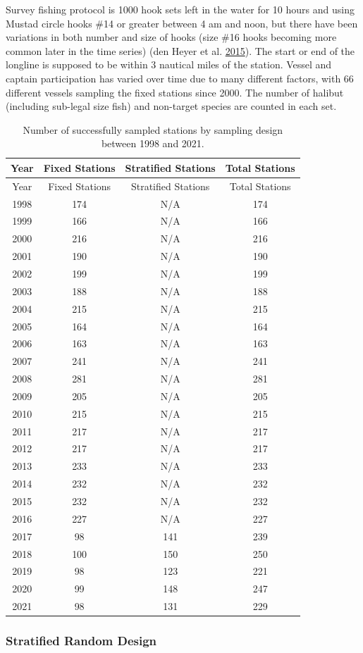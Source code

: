 \documentclass[12pt]{article}\usepackage[]{graphicx}\usepackage[]{color}
\begin{document}
Survey fishing protocol is 1000 hook sets left in the water for 10 hours and using Mustad circle hooks \#14 or greater between 4 am and noon, but there have been variations in both number and size of hooks (size \#16 hooks becoming more common later in the time series) (den Heyer et al. \protect\hyperlink{ref-DenHeyer2015}{2015}). The start or end of the longline is supposed to be within 3 nautical miles of the station. Vessel and captain participation has varied over time due to many different factors, with 66 different vessels sampling the fixed stations since 2000. The number of halibut (including sub-legal size fish) and non-target species are counted in each set.
\begin{longtable}[]{@{}cccc@{}}
\caption{\label{tab:stat-samp}Number of successfully sampled stations by sampling design between 1998 and 2021.}\tabularnewline
\toprule
Year & Fixed Stations & Stratified Stations & Total Stations\tabularnewline
\midrule
\endfirsthead
\toprule
Year & Fixed Stations & Stratified Stations & Total Stations\tabularnewline
\midrule
\endhead
1998 & 174 & N/A & 174\tabularnewline
1999 & 166 & N/A & 166\tabularnewline
2000 & 216 & N/A & 216\tabularnewline
2001 & 190 & N/A & 190\tabularnewline
2002 & 199 & N/A & 199\tabularnewline
2003 & 188 & N/A & 188\tabularnewline
2004 & 215 & N/A & 215\tabularnewline
2005 & 164 & N/A & 164\tabularnewline
2006 & 163 & N/A & 163\tabularnewline
2007 & 241 & N/A & 241\tabularnewline
2008 & 281 & N/A & 281\tabularnewline
2009 & 205 & N/A & 205\tabularnewline
2010 & 215 & N/A & 215\tabularnewline
2011 & 217 & N/A & 217\tabularnewline
2012 & 217 & N/A & 217\tabularnewline
2013 & 233 & N/A & 233\tabularnewline
2014 & 232 & N/A & 232\tabularnewline
2015 & 232 & N/A & 232\tabularnewline
2016 & 227 & N/A & 227\tabularnewline
2017 & 98 & 141 & 239\tabularnewline
2018 & 100 & 150 & 250\tabularnewline
2019 & 98 & 123 & 221\tabularnewline
2020 & 99 & 148 & 247\tabularnewline
2021 & 98 & 131 & 229\tabularnewline
\bottomrule
\end{longtable}
\hypertarget{stratified-random-design}{%
\subsubsection{Stratified Random Design}\label{stratified-random-design}}
\end{document}
